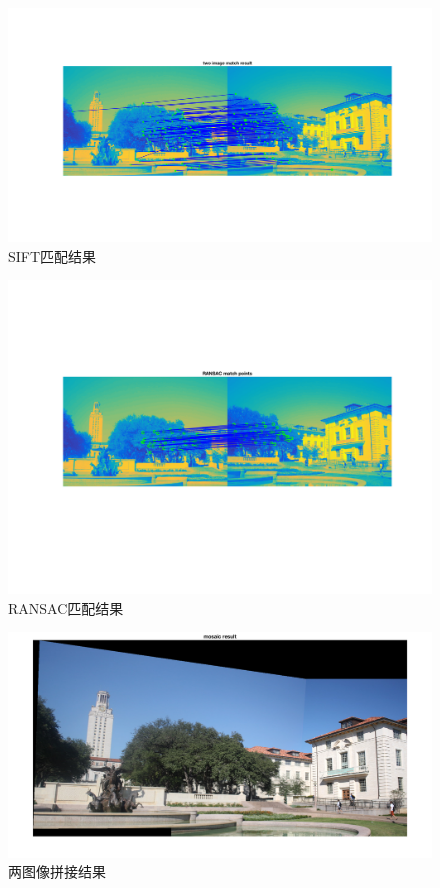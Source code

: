 \documentclass[a4paper, UTF8]{ctexrep}
\begin{document}
		\begin{figure}[htbp!]
			\centering
			\includegraphics[width = \textwidth]{hw2_fig3.png}
			\caption{SIFT匹配结果}
			\label{fig:figure1}
		\end{figure}
		\clearpage
		\begin{figure}[htbp!]
			\centering
			\includegraphics[width = \textwidth]{hw2_fig4.png}
			\caption{RANSAC匹配结果}
			\label{fig:figure1}
		\end{figure}
		\clearpage
		\begin{figure}[htbp!]
			\centering
			\includegraphics[width = \textwidth]{hw2_fig5.png}
			\caption{两图像拼接结果}
			\label{fig:figure1}
		\end{figure}
\end{document}
